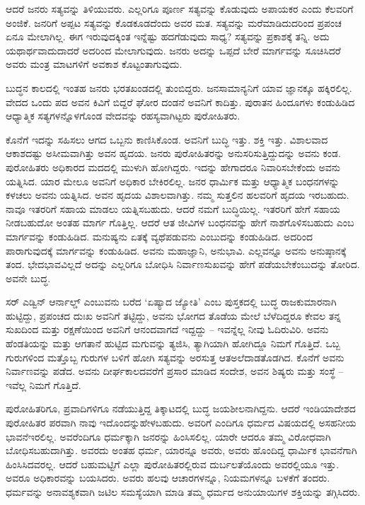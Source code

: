 \newpage

ಆದರೆ ಜನರು ಸತ್ಯವನ್ನು ತಿಳಿಯುವರು. ಎಲ್ಲರಿಗೂ ಪೂರ್ಣ ಸತ್ಯವನ್ನು ಕೊಡುವುದು ಅಪಾಯಕರ ಎಂದು ಕೆಲವರಿಗೆ ಅಂಜಿಕೆ. ಜನರಿಗೆ ಅಪ್ಪಟ ಸತ್ಯವನ್ನು ಕೊಡಕೂಡದೆಂದು ಅವರ ಮತ. ಸತ್ಯವನ್ನು ಮರೆಮಾಡಿದುದರಿಂದ ಪ್ರಪಂಚ ಏನೂ ಮೇಲಾಗಿಲ್ಲ. ಈಗ ಇರುವುದಕ್ಕಿಂತ ಇನ್ನೆಷ್ಟು ಹದಗೆಡುವುದು ಸಾಧ್ಯ? ಸತ್ಯವನ್ನು ಪ್ರಕಾಶಕ್ಕೆ ತನ್ನಿ. ಅದು ಯಥಾರ್ಥವಾದುದಾದರೆ ಅದರಿಂದ ಮೇಲಾಗುವುದು. ಜನರು ಅದನ್ನು ಒಪ್ಪದೆ ಬೇರೆ ಮಾರ್ಗವನ್ನು ಸೂಚಿಸಿದರೆ ಅವರು ಮಂತ್ರ ಮಾಟಗಳಿಗೆ ಅವಕಾಶ ಕೊಟ್ಟಂತಾಗುವುದು.

ಬುದ್ಧನ ಕಾಲದಲ್ಲಿ ಇಂತಹ ಜನರು ಭರತಖಂಡದಲ್ಲಿ ತುಂಬಿದ್ದರು. ಜನಸಾಮಾನ್ಯನಿಗೆ ಯಾವ ಜ್ಞಾನಕ್ಕೂ ಹಕ್ಕಿರಲಿಲ್ಲ. ವೇದದ ಒಂದು ಪದ ಅವನ ಕಿವಿಗೆ ಬಿದ್ದರೆ ಘೋರ ದಂಡನೆ ಅವನಿಗೆ ಕಾದಿತ್ತು. ಪುರಾತನ ಹಿಂದೂಗಳು ಕಂಡುಹಿಡಿದ ಆಧ್ಯಾತ್ಮಿಕ ಸತ್ಯಗಳನ್ನೊಳಗೊಂಡ ವೇದವನ್ನು ರಹಸ್ಯವಾಗಿಟ್ಟರು ಪುರೋಹಿತರು.

ಕೊನೆಗೆ ಇದನ್ನು ಸಹಿಸಲು ಆಗದ ಒಬ್ಬನು ಕಾಣಿಸಿಕೊಂಡ. ಅವನಿಗೆ ಬುದ್ಧಿ ಇತ್ತು. ಶಕ್ತಿ ಇತ್ತು. ವಿಶಾಲವಾದ ಆಕಾಶದಷ್ಟು ಅಸೀಮವಾಗಿತ್ತು ಅವನ ಹೃದಯ. ಜನರು ಪುರೋಹಿತರನ್ನು ಅನುಸರಿಸುತ್ತಿದ್ದುದನ್ನು ಅವನು ಕಂಡ. ಪುರೋಹಿತರು ಅಧಿಕಾರದ ಮದದಲ್ಲಿ ಮುಳುಗಿ ಹೋಗಿದ್ದರು. ಇದನ್ನು ಹೇಗಾದರೂ ನಿವಾರಿಸಬೇಕೆಂದು ಅವನು ಯತ್ನಿಸಿದ. ಯಾರ ಮೇಲೂ ಅವನಿಗೆ ಅಧಿಕಾರ ಬೇಕಿರಲಿಲ್ಲ. ಜನರ ಧಾರ್ಮಿಕ ಮತ್ತು ಆಧ್ಯಾತ್ಮಿಕ ಬಂಧನಗಳನ್ನು ಕಳಚಲು ಅವನು ಯತ್ನಿಸಿದ. ಅವನ ಹೃದಯ ವಿಶಾಲ\-ವಾಗಿತ್ತು. ನಮ್ಮ ಸುತ್ತಲಿನ ಹಲವರಿಗೆ ಹೃದಯ ಇರಬಹುದು. ನಾವೂ ಇತರರಿಗೆ ಸಹಾಯ ಮಾಡಲು ಯತ್ನಿಸಬಹುದು. ಆದರೆ ನಮಗೆ ಬುದ್ಧಿಯಿಲ್ಲ. ಇತರರಿಗೆ ಹೇಗೆ ಸಹಾಯ ನೀಡಬಹುದೋ ಅಂತಹ ಮಾರ್ಗ ಗೊತ್ತಿಲ್ಲ. ಆದರೆ ಆತ ಜೀವಿಗಳ ಬಂಧನವನ್ನು ಹೇಗೆ ನಾಶಗೊಳಿಸಬಹುದು ಎಂಬ ಮಾರ್ಗವನ್ನು ಕಂಡುಹಿಡಿದ. ಮನುಷ್ಯನು ಏತಕ್ಕೆ ವ್ಯಥೆಪಡುವನು ಎಂಬುದನ್ನು ಕಂಡುಹಿಡಿದ. ಅದರಿಂದ ಪಾರಾಗುವುದಕ್ಕೆ ಮಾರ್ಗವನ್ನು ಕಂಡುಹಿಡಿದ. ಅವನು ಮಹಾಜ್ಞಾನಿ, ಅನುಭಾವಿ. ಎಲ್ಲವನ್ನೂ ಅವನು ಅನುಷ್ಠಾನಕ್ಕೆ ತಂದ. ಭೇದಭಾವವಿಲ್ಲದೆ ಅದನ್ನು ಎಲ್ಲರಿಗೂ ಬೋಧಿಸಿ ನಿರ್ವಾಣಸುಖವನ್ನು ಹೇಗೆ ಪಡೆಯಬೇಕೆಂಬುದನ್ನು ತೋರಿದ. ಅವನೇ ಬುದ್ಧ.

ಸರ್​ ಎಡ್ವಿನ್​ ಆರ್ನಾಲ್ಡ್​ ಎಂಬುವನು ಬರೆದ ‘ಏಷ್ಯಾದ ಜ್ಯೋತಿ’ ಎಂಬ ಪುಸ್ತಕದಲ್ಲಿ ಬುದ್ಧ ರಾಜಕುಮಾರನಾಗಿ ಹುಟ್ಟಿದ್ದು, ಪ್ರಪಂಚದ ದುಃಖ ಅವನಿಗೆ ತಟ್ಟಿದ್ದು, ಅವನು ಭೋಗದ ತೊಡೆಯ ಮೇಲೆ ಬೆಳೆದಿದ್ದರೂ ಕೇವಲ ತನ್ನ ಸುಖದಿಂದ ಮತ್ತು ರಕ್ಷಣೆಯಿಂದ ಅವನಿಗೆ ಆನಂದವಾಗದೆ ಇದ್ದದ್ದು – ಇವನ್ನೆಲ್ಲ ನೀವು ಓದಿರುವಿರಿ. ಅವನು ಹೆಂಡತಿಯನ್ನು ಮತ್ತು ಆಗತಾನೆ ಹುಟ್ಟಿದ ಮಗುವನ್ನು ತ್ಯಜಿಸಿ, ತ್ಯಾಗಿಯಾಗಿ ಹೋಗಿದ್ದೂ ನಿಮಗೆ ಗೊತ್ತಿದೆ. ಒಬ್ಬ ಗುರುಗಳಿಂದ ಮತ್ತೊಬ್ಬ ಗುರುಗಳ ಬಳಿಗೆ ಹೋಗಿ ಸತ್ಯವನ್ನು ಅರಸುತ್ತ ಆತ\break ಅಲೆದಾಡತೊಡಗಿದ. ಕೊನೆಗೆ ಅವನು ನಿರ್ವಾಣವನ್ನು ಪಡೆದ. ಅವನು ದೀರ್ಘಕಾಲದವರೆಗೆ ಪ್ರಸಾರ ಮಾಡಿದ ಸಂದೇಶ, ಅವನ ಶಿಷ್ಯರು ಮತ್ತು ಸಂಸ್ಥೆ – ಇವೆಲ್ಲ ನಿಮಗೆ ಗೊತ್ತಿದೆ.

ಪುರೋಹಿತರಿಗೂ, ಪ್ರವಾದಿಗಳಿಗೂ ನಡೆಯುತ್ತಿದ್ದ ತಿಕ್ಕಾಟದಲ್ಲಿ ಬುದ್ಧ ಜಯಶೀಲ\-ನಾಗಿದ್ದನು. ಆದರೆ ಇಂಡಿಯಾದೇಶದ ಪುರೋಹಿತರ ಪರವಾಗಿ ನಾವು ಇದೊಂದನ್ನು\break ಹೇಳಬಹುದು. ಅವರಿಗೆ ಎಂದಿಗೂ ಧರ್ಮದ ವಿಷಯದಲ್ಲಿ ಅಸಹನೀಯ ಭಾವನೆ\break ಇರಲಿಲ್ಲ. ಅವರೆಂದಿಗೂ ಧರ್ಮಕ್ಕಾಗಿ ಜನರನ್ನು ಹಿಂಸಿಸಲಿಲ್ಲ. ಯಾರೇ ಆದರೂ ತಮ್ಮ ವಿರೋಧವಾಗಿ ಬೋಧಿಸಬಹುದಾಗಿತ್ತು. ಅವರದು ಅಂತಹ ಧರ್ಮ, ಯಾರನ್ನೂ ಅವರು, ಅವರು ಹೊಂದಿದ್ದ ಧಾರ್ಮಿಕ ಭಾವನೆಗಾಗಿ ಹಿಂಸಿಸಿದವರಲ್ಲ. ಆದರೆ ಬಹುಮಟ್ಟಿಗೆ ಎಲ್ಲಾ ಪುರೋಹಿತರಲ್ಲಿರುವ ದುರ್ಬಲತೆಯೊಂದು ಅವರಲ್ಲಿಯೂ ಇತ್ತು. ಅವರೂ ಅಧಿಕಾರವನ್ನು ಬಯಸಿದರು. ಅವರು ಹಲವು ಆಚಾರಗಳನ್ನೂ, ನಿಯಮಗಳನ್ನೂ ಬಳಕೆಗೆ ತಂದರು. ಧರ್ಮವನ್ನು ಅನಾವಶ್ಯಕವಾಗಿ ಜಟಿಲ ಸಮಸ್ಯೆಯಾಗಿ ಮಾಡಿ ತಮ್ಮ ಧರ್ಮದ ಅನುಯಾಯಿಗಳ ಶಕ್ತಿಯನ್ನು ತಗ್ಗಿಸಿದರು.

